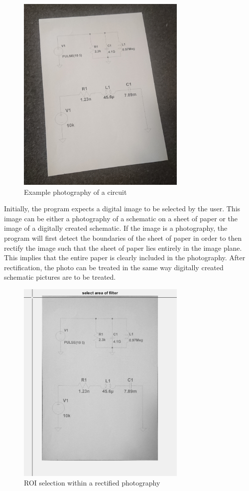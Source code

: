 \documentclass[10pt,twocolumn,letterpaper]{article}
\begin{document}
\begin{figure}[!ht]
\includegraphics[width = 3.2in]{img/S04.JPG}
\caption{Example photography of a circuit}
\label{fig:c2}
\end{figure}

\par
Initially, the program expects a digital image to be selected by the user. This image can be either a photography of a schematic on a sheet of paper or the image of a digitally created schematic. If the image is a photography, the program will first detect the boundaries of the sheet of paper in order to then rectify the image such that the sheet of paper lies entirely in the image plane. This implies that the entire paper is clearly included in the photography. After rectification, the photo can be treated in the same way digitally created schematic pictures are to be treated.
\par

\begin{figure}[!ht]
\includegraphics[width = 3.2in]{img/roi.png}
\caption{ROI selection within a rectified photography}
\label{fig:c3}
\end{figure}
\end{document}
